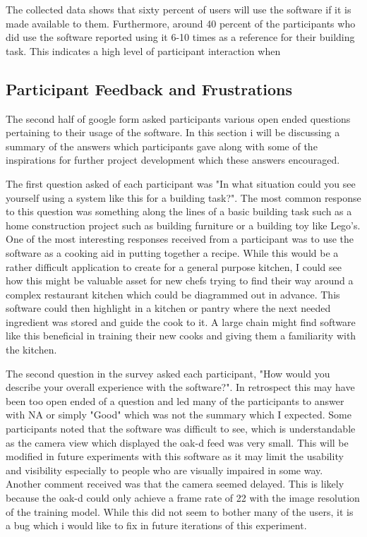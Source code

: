 \documentclass{vgtc}                          %
\begin{document}
The collected data shows that sixty percent of users will use the software if it is made available to them. Furthermore, around 40 percent of the participants who did use the software reported using it 6-10 times as a reference for their building task. This indicates a high level of participant interaction when 

\subsection{Participant Feedback and Frustrations}


The second half of google form asked participants various open ended questions pertaining to their usage of the software. In this section i will be discussing a summary of the answers which participants gave along with some of the inspirations for further project development which these answers encouraged. 

The first question asked of each participant was "In what situation could you see yourself using a system like this for a building task?". The most common response to this question was something along the lines of a basic building task such as a home construction project such as building furniture or a building toy like Lego's. One of the most interesting responses received from a participant was to use the software as a cooking aid in putting together a recipe. While this would be a rather difficult application to create for a general purpose kitchen, I could see how this might be valuable asset for new chefs trying to find their way around a complex restaurant kitchen which could be diagrammed out in advance. This software could then highlight in a kitchen or pantry where the next needed ingredient was stored and guide the cook to it. A large chain might find software like this beneficial in training their new cooks and giving them a familiarity with the kitchen.

The second question in the survey asked each participant, "How would you describe your overall experience with the software?". In retrospect this may have been too open ended of a question and led many of the participants to answer with NA or simply "Good" which was not the summary which I expected. Some participants noted that the software was difficult to see, which is understandable as the camera view which displayed the oak-d feed was very small. This will be modified in future experiments with this software as it may limit the usability and visibility especially to people who are visually impaired in some way. Another comment received was that the camera seemed delayed. This is likely because the oak-d could only achieve a frame rate of 22 with the image resolution of the training model. While this did not seem to bother many of the users, it is a bug which i would like to fix in future iterations of this experiment.
\end{document}
